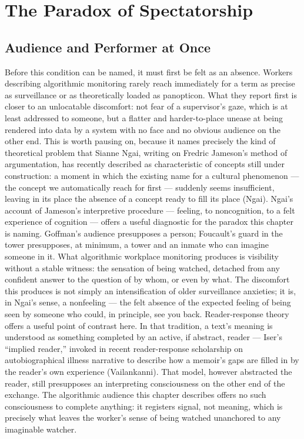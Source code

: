 \documentclass[12pt]{article}
\begin{document}
\section{The Paradox of Spectatorship}

\subsection{Audience and Performer at Once}

Before this condition can be named, it must first be felt as an absence. Workers describing algorithmic monitoring rarely reach immediately for a term as precise as surveillance or as theoretically loaded as panopticon. What they report first is closer to an unlocatable discomfort: not fear of a supervisor's gaze, which is at least addressed to someone, but a flatter and harder-to-place unease at being rendered into data by a system with no face and no obvious audience on the other end. This is worth pausing on, because it names precisely the kind of theoretical problem that Sianne Ngai, writing on Fredric Jameson's method of argumentation, has recently described as characteristic of concepts still under construction: a moment in which the existing name for a cultural phenomenon --- the concept we automatically reach for first --- suddenly seems insufficient, leaving in its place the absence of a concept ready to fill its place (Ngai). Ngai's account of Jameson's interpretive procedure --- feeling, to noncognition, to a felt experience of cognition --- offers a useful diagnostic for the paradox this chapter is naming. Goffman's audience presupposes a person; Foucault's guard in the tower presupposes, at minimum, a tower and an inmate who can imagine someone in it. What algorithmic workplace monitoring produces is visibility without a stable witness: the sensation of being watched, detached from any confident answer to the question of by whom, or even by what. The discomfort this produces is not simply an intensification of older surveillance anxieties; it is, in Ngai's sense, a nonfeeling --- the felt absence of the expected feeling of being seen by someone who could, in principle, see you back. Reader-response theory offers a useful point of contrast here. In that tradition, a text's meaning is understood as something completed by an active, if abstract, reader --- Iser's ``implied reader,'' invoked in recent reader-response scholarship on autobiographical illness narrative to describe how a memoir's gaps are filled in by the reader's own experience (Vailankanni). That model, however abstracted the reader, still presupposes an interpreting consciousness on the other end of the exchange. The algorithmic audience this chapter describes offers no such consciousness to complete anything: it registers signal, not meaning, which is precisely what leaves the worker's sense of being watched unanchored to any imaginable watcher.
\end{document}
